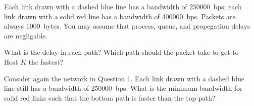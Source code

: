 \documentclass[12pt,addpoints,answers]{exam}
\begin{document}
\begin{questions}
\begin{center}
\end{center}
Each link drawn with a dashed blue line has a bandwidth of \SI{250000}{bps}; each link drawn with a solid red line has a bandwidth of \SI{400000}{bps}. Packets are always \SI{1000}{bytes}. You may assume that process, queue, and propegation delays are negligable.

What is the delay in each path? Which path should the packet take to get to Host $K$ the fastest?
\begin{solution}
\end{solution}

\question[8] Consider again the network in Question 1. Each link drawn with a dashed blue line still has a bandwidth of \SI{250000}{bps}. What is the minimum bandwidth for solid red links such that the bottom path is faster than the top path?
\begin{solution}
\end{solution}


\end{questions}
\end{document}
